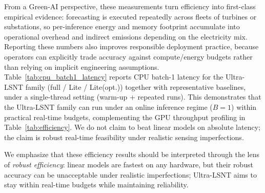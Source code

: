 \documentclass[review,3p,times]{elsarticle}
\begin{document}
From a Green-AI perspective, these measurements turn efficiency into first-class empirical evidence: forecasting is executed repeatedly across fleets of turbines or substations, so per-inference energy and memory footprint accumulate into operational overhead and indirect emissions depending on the electricity mix. Reporting these numbers also improves responsible deployment practice, because operators can explicitly trade accuracy against compute/energy budgets rather than relying on implicit engineering assumptions. Table~\ref{tab:cpu_batch1_latency} reports CPU batch-1 latency for the Ultra-LSNT family (full / Lite / Lite(opt.)) together with representative baselines, under a single-thread setting (warm-up + repeated runs). This demonstrates that the Ultra-LSNT family can run under an online inference regime ($B=1$) within practical real-time budgets, complementing the GPU throughput profiling in Table~\ref{tab:efficiency}. We do not claim to beat linear models on absolute latency; the claim is robust real-time feasibility under realistic sensing imperfections.

We emphasize that these efficiency results should be interpreted through the lens of \emph{robust efficiency}: linear models are fastest on any hardware, but their robust accuracy can be unacceptable under realistic imperfections; Ultra-LSNT aims to stay within real-time budgets while maintaining reliability.
\end{document}
